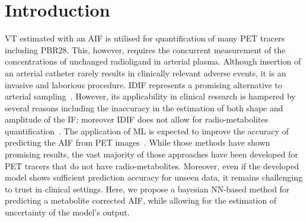 \vspace{-0.6cm}

\section{Introduction} \label{sec:introduction}\vspace{-0.3cm}\vspace{0.2cm}
     \gls{VT} estimated with an \gls{AIF} is utilised for  quantification of many \gls{PET} tracers including \gls{PBR28}. This, however, requires the concurrent measurement of the concentrations of unchanged radioligand in arterial plasma. Although insertion of an arterial catheter rarely results in clinically relevant adverse events, it is an invasive and laborious procedure. 
    \gls{IDIF} represents a promising alternative to arterial sampling~\cite{Zanotti-Fregonara2011}. However, its applicability in clinical research is hampered by several reasons including the inaccuracy in the estimation of both shape and amplitude of the \gls{IF}; moreover \gls{IDIF} does not allow for radio-metabolites quantification~\cite{Sari2018Non-invasive11C-SB201745}. The application of \gls{ML} is expected to improve the accuracy of predicting the \gls{AIF} from \gls{PET} images~\cite{Kuttner2020, Ferrante2022PhysicallyImaging}. While those methods have shown promising results, the vast majority of those approaches have been developed for \gls{PET} tracers that do not have radio-metabolites. Moreover, even if the developed model shows sufficient prediction accuracy for unseen data, it remains challenging to trust  in clinical settings. Here, we propose a bayesian \gls{NN}-based method for predicting a metabolite corrected \gls{AIF}, while allowing for the estimation of uncertainty of the model's output.%
    
